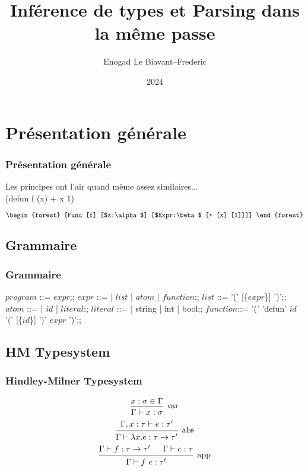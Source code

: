 \documentclass{beamer}
\title{Inférence de types et Parsing dans la même passe}
\author{Enogad Le Biavant--Frederic}
\institute{Alain René Lesage MP2I}
\date{2024}
\begin{document}
\frame{\titlepage}

\section{Présentation générale}
\begin{frame}
\frametitle{Présentation générale}
Les principes ont l'air quand même assez similaires... \\
(defun f (x) + x 1)

\[
\begin{forest}
		[Func [f] [$x:\alpha$] [$Expr:\beta$ [+ [x] [1]]]]
\end{forest}
\]

\end{frame}

\subsection{Grammaire}
\begin{frame}
\frametitle{Grammaire}

\begin{bnf}
		$program$ ::= $expr$;;
		$expr$    ::= | $list$ | $atom$ | $function$;;
		$list$    ::= '(' [\{$expr$\}] ')';;
		$atom$    ::= | $id$ | $literal$;;
		$literal$ ::= | string | int | bool;;
		$function$::= '(' 'defun' $id$ '(' [\{$id$\}] ')' $expr$ ')';;
\end{bnf} \end{frame}
\subsection{HM Typesystem}
\begin{frame}
\frametitle{Hindley-Milner Typesystem}
\[
\begin{prooftree}
		\hypo{x:\sigma\in\Gamma}
		\infer1[var]{\Gamma \vdash x:\sigma}
\end{prooftree}
\]
\newline
\[
\begin{prooftree}
		\hypo{\Gamma, x:\tau \vdash e:\tau'}
		\infer1[abs]{\Gamma \vdash \lambda x.e:\tau \to \tau'}
\end{prooftree}
\]
\newline
\[
\begin{prooftree}
		\hypo{\Gamma \vdash f:\tau \to \tau'}
		\hypo{\Gamma \vdash e : \tau}
		\infer2[app]{\Gamma \vdash f\ e : \tau'}
\end{prooftree}
\]
\end{frame}
\end{document}
